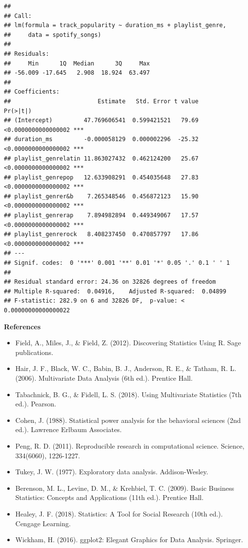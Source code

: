 \documentclass[
  b5paper]{book}
\providecommand{\tightlist}{%
  \setlength{\itemsep}{0pt}\setlength{\parskip}{0pt}}
\begin{document}
\begin{verbatim}
## 
## Call:
## lm(formula = track_popularity ~ duration_ms + playlist_genre, 
##     data = spotify_songs)
## 
## Residuals:
##     Min      1Q  Median      3Q     Max 
## -56.009 -17.645   2.908  18.924  63.497 
## 
## Coefficients:
##                         Estimate   Std. Error t value            Pr(>|t|)    
## (Intercept)         47.769606541  0.599421521   79.69 <0.0000000000000002 ***
## duration_ms         -0.000058129  0.000002296  -25.32 <0.0000000000000002 ***
## playlist_genrelatin 11.863027432  0.462124200   25.67 <0.0000000000000002 ***
## playlist_genrepop   12.633908291  0.454035648   27.83 <0.0000000000000002 ***
## playlist_genrer&b    7.265348546  0.456872123   15.90 <0.0000000000000002 ***
## playlist_genrerap    7.894982894  0.449349067   17.57 <0.0000000000000002 ***
## playlist_genrerock   8.408237450  0.470857797   17.86 <0.0000000000000002 ***
## ---
## Signif. codes:  0 '***' 0.001 '**' 0.01 '*' 0.05 '.' 0.1 ' ' 1
## 
## Residual standard error: 24.36 on 32826 degrees of freedom
## Multiple R-squared:  0.04916,    Adjusted R-squared:  0.04899 
## F-statistic: 282.9 on 6 and 32826 DF,  p-value: < 0.00000000000000022
\end{verbatim}

\textbf{References}

\begin{itemize}
\tightlist
\item
  Field, A., Miles, J., \& Field, Z. (2012). Discovering Statistics Using R. Sage publications.
\item
  Hair, J. F., Black, W. C., Babin, B. J., Anderson, R. E., \& Tatham, R. L. (2006). Multivariate Data Analysis (6th ed.). Prentice Hall.
\item
  Tabachnick, B. G., \& Fidell, L. S. (2018). Using Multivariate Statistics (7th ed.). Pearson.
\item
  Cohen, J. (1988). Statistical power analysis for the behavioral sciences (2nd ed.). Lawrence Erlbaum Associates.
\item
  Peng, R. D. (2011). Reproducible research in computational science. Science, 334(6060), 1226-1227.
\item
  Tukey, J. W. (1977). Exploratory data analysis. Addison-Wesley.
\item
  Berenson, M. L., Levine, D. M., \& Krehbiel, T. C. (2009). Basic Business Statistics: Concepts and Applications (11th ed.). Prentice Hall.
\item
  Healey, J. F. (2018). Statistics: A Tool for Social Research (10th ed.). Cengage Learning.
\item
  Wickham, H. (2016). ggplot2: Elegant Graphics for Data Analysis. Springer.
\end{itemize}
\end{document}
